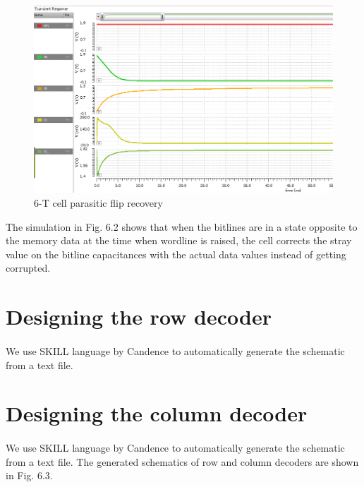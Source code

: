 \begin{figure}[H]
\centering
\includegraphics[width=\textwidth]{6trecovery.png}
\caption{6-T cell parasitic flip recovery}
\label{fig:Figure}
\end{figure}
The simulation in Fig. 6.2 shows that when the bitlines are in a state opposite to the memory data at the time when wordline is raised, the cell corrects the stray value on the bitline capacitances with the actual data values instead of getting corrupted.
\section{Designing the row decoder}
\paragraph{}
We use SKILL language by Candence to automatically generate the schematic from a text file.

\section{Designing the column decoder}
\paragraph{}
We use SKILL language by Candence to automatically generate the schematic from a text file. The generated schematics of row and column decoders are shown in Fig. 6.3.

